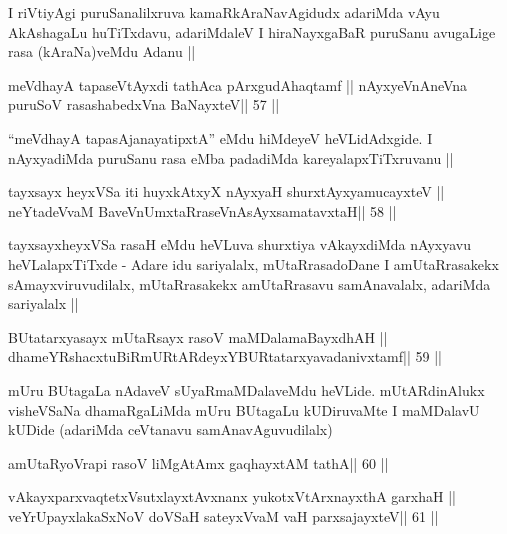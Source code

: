 \begin{artha}
I riVtiyAgi puruSanalilxruva kamaRkAraNavAgidudx adariMda vAyu
AkAshagaLu huTiTxdavu, adariMdaleV I hiraNayxgaBaR puruSanu avugaLige
rasa (kAraNa)veMdu Adanu ||
\end{artha}

\begin{shl}
meVdhayA tapaseVtAyxdi tathAca pArxgudAhaqtamf ||
nAyxyeVnAneVna puruSoV rasashabedxVna BaNayxteV\hfill || 57 ||
\end{shl}

\begin{artha}
``meVdhayA tapasA\s janayatipxtA'' eMdu hiMdeyeV heVLidAdxgide. I
nAyxyadiMda puruSanu rasa eMba padadiMda kareyalapxTiTxruvanu ||
\end{artha}

\begin{shl}
tayxsayx heyxVSa iti huyxkAtxyX nAyxyaH shurxtAyx\s yamucayxteV ||
neYtadeVvaM BaveVnUmxtaRraseVnAsAyxsamatavxtaH\hfill || 58 ||
\end{shl}

\begin{artha}
tayxsayxheyxVSa rasaH eMdu heVLuva shurxtiya vAkayxdiMda nAyxyavu
heVLalapxTiTxde - Adare idu sariyalalx, mUtaRrasadoDane I
amUtaRrasakekx sAmayxviruvudilalx, mUtaRrasakekx amUtaRrasavu
samAnavalalx, adariMda sariyalalx ||
\end{artha}



\begin{shl}
BUtatarxyasayx mUtaRsayx rasoV maMDalamaBayxdhAH ||
dhameYRshacxtuBiRmURtARdeyxYBURtatarxyavadanivxtamf\hfill || 59 ||
\end{shl}

\begin{artha}
mUru BUtagaLa nAdaveV sUyaRmaMDalaveMdu heVLide. mUtARdinAlukx
visheVSaNa dhamaRgaLiMda mUru BUtagaLu kUDiruvaMte I maMDalavU kUDide
(adariMda ceVtanavu samAnavAguvudilalx)
\end{artha}

\begin{shl}
\footnotemark[1]amUtaRyoVrapi rasoV liMgAtAmx gaqhayxtAM tathA\hfill || 60 ||
\end{shl}

\begin{shl}
vAkayxparxvaqtetxVsutxlayxtAvxnanx yukotxV\s tArxnayxthA garxhaH ||
veYrUpayxlakaSxNoV doVSaH sateyxVvaM vaH parxsajayxteV\hfill || 61 ||
\end{shl}

